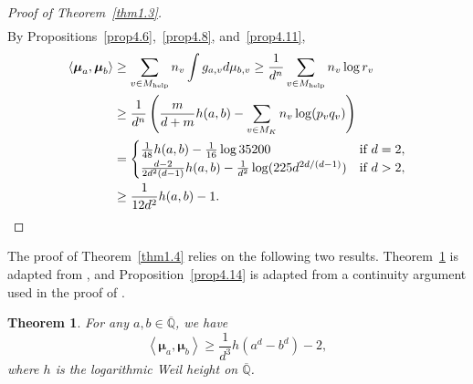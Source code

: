 \documentclass[10pt,a4paper]{amsart}
\numberwithin{equation}{section}
\theoremstyle{plain}
\newtheorem{thm}{Theorem}[section]
\theoremstyle{definition}
\theoremstyle{remark}
\newcommand{\Q}{\mathbb Q}
\newcommand{\help}{\mathrm{help}}
\renewcommand{\bar}{\overline}
\begin{document}
\begin{proof}[Proof of Theorem~\ref{thm1.3}]
\begin{align*}
\end{align*}
By Propositions~\ref{prop4.6},~\ref{prop4.8}, and~\ref{prop4.11},
\begin{align*}
\left\langle \boldsymbol{\mu}_{a},\boldsymbol{\mu}_{b}\right\rangle  & \geq\sum_{v\in M_{\help}}n_{v}\int g_{a,v}d\mu_{b,v}\geq\frac{1}{d^{n}}\sum_{v\in M_{\help}}n_{v}\log r_{v}\\
 & \geq\frac{1}{d^{n}}\left(\frac{m}{d+m}h(a,b)-\sum_{v\in M_{K}}n_{v}\log(p_{v}q_{v})\right)\\
 & =\begin{cases}
\frac{1}{48}h(a,b)-\frac{1}{16}\log35200 & \text{if }d=2,\\
\frac{d-2}{2d^{2}(d-1)}h(a,b)-\frac{1}{d^{2}}\log(225d^{2d/(d-1)}) & \text{if }d>2,
\end{cases}\\
 & \geq\frac{1}{12d^{2}}h(a,b)-1.\qedhere
\end{align*}
\end{proof}

The proof of Theorem~\ref{thm1.4} relies on the following two results.
Theorem~\ref{thm4.13} is adapted from \cite[Theorem 7.1]{DKY2},
and Proposition~\ref{prop4.14} is adapted from a continuity argument
used in the proof of \cite[Theorem 1.6]{DKY2}.

\begin{thm}
\label{thm4.13}For any $a,b\in\bar{\Q}$, we have
\[
\left\langle \boldsymbol{\mu}_{a},\boldsymbol{\mu}_{b}\right\rangle \geq\frac{1}{d^{3}}h\left(a^{d}-b^{d}\right)-2,
\]
where $h$ is the logarithmic Weil height on $\bar{\Q}$.
\end{thm}
\end{document}
